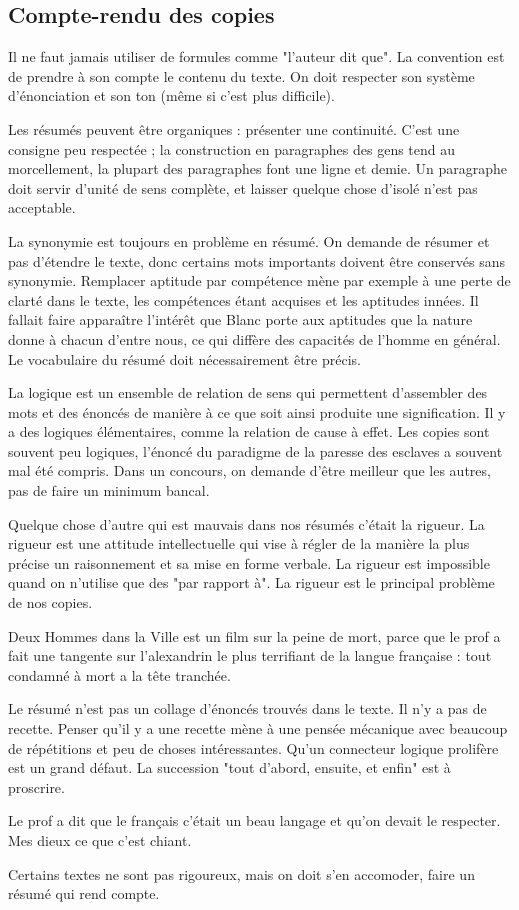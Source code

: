 \documentclass[a4paper,12pt]{book}
\begin{document}
\subsection{Compte-rendu des copies}
Il ne faut jamais utiliser de formules comme "l'auteur dit que". La convention est de prendre à son compte le contenu du texte. On doit respecter son système d'énonciation et son ton (même si c'est plus difficile). \par Les résumés peuvent être organiques : présenter une continuité. C'est une consigne peu respectée ; la construction en paragraphes des gens tend au morcellement, la plupart des paragraphes font une ligne et demie. Un paragraphe doit servir d'unité de sens complète, et laisser quelque chose d'isolé n'est pas acceptable. \par La synonymie est toujours en problème en résumé. On demande de résumer et pas d'étendre le texte, donc certains mots importants doivent être conservés sans synonymie. Remplacer aptitude par compétence mène par exemple à une perte de clarté dans le texte, les compétences étant acquises et les aptitudes innées. Il fallait faire apparaître l'intérêt que Blanc porte aux aptitudes que la nature donne à chacun d'entre nous, ce qui diffère des capacités de l'homme en général. Le vocabulaire du résumé doit nécessairement être précis. \par La logique est un ensemble de relation de sens qui permettent d'assembler des mots et des énoncés de manière à ce que soit ainsi produite une signification. Il y a des logiques élémentaires, comme la relation de cause à effet. Les copies sont souvent peu logiques, l'énoncé du paradigme de la paresse des esclaves a souvent mal été compris. Dans un concours, on demande d'être meilleur que les autres, pas de faire un minimum bancal. \par Quelque chose d'autre qui est mauvais dans nos résumés c'était la rigueur. La rigueur est une attitude intellectuelle qui vise à régler de la manière la plus précise un raisonnement et sa mise en forme verbale. La rigueur est impossible quand on n'utilise que des "par rapport à". La rigueur est le principal problème de nos copies. \par Deux Hommes dans la Ville est un film sur la peine de mort, parce que le prof a fait une tangente sur l'alexandrin le plus terrifiant de la langue française : tout condamné à mort a la tête tranchée. \par Le résumé n'est pas un collage d'énoncés trouvés dans le texte. Il n'y a pas de recette. Penser qu'il y a une recette mène à une pensée mécanique avec beaucoup de répétitions et peu de choses intéressantes. Qu'un connecteur logique prolifère est un grand défaut. La succession "tout d'abord, ensuite, et enfin" est à proscrire. \par Le prof a dit que le français c'était un beau langage et qu'on devait le respecter. Mes dieux ce que c'est chiant. \par Certains textes ne sont pas rigoureux, mais on doit s'en accomoder, faire un résumé qui rend compte.
\end{document}
